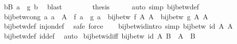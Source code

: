 \begin{isabellebody}
\ {\isachardoublequoteopen}{\isasymexists}b{\isasymin}B{\isachardot}{\kern0pt}\ a\ {\isacharequal}{\kern0pt}\ {\isacharquery}{\kern0pt}g\ b{\isachardoublequoteclose}\ \isamarkupfalse%
\ blast\isanewline
\ \ \isamarkupfalse%
\isanewline
\ \ \isamarkupfalse%
\ \isamarkupfalse%
\ {\isacharquery}{\kern0pt}thesis\isanewline
\ \ \ \ \isamarkupfalse%
\ {\isacharparenleft}{\kern0pt}auto\ simp{\isacharcolon}{\kern0pt}\ bij{\isacharunderscore}{\kern0pt}betw{\isacharunderscore}{\kern0pt}def{\isacharparenright}{\kern0pt}\isanewline
{}\isamarkupfalse%
%
\endisatagproof
{\isafoldproof}%
%
\isadelimproof
\isanewline
%
\endisadelimproof
\isanewline
{}\isamarkupfalse%
\ bij{\isacharunderscore}{\kern0pt}betw{\isacharunderscore}{\kern0pt}cong{\isacharcolon}{\kern0pt}\ {\isachardoublequoteopen}{\isacharparenleft}{\kern0pt}{\isasymAnd}a{\isachardot}{\kern0pt}\ a\ {\isasymin}\ A\ {\isasymLongrightarrow}\ f\ a\ {\isacharequal}{\kern0pt}\ g\ a{\isacharparenright}{\kern0pt}\ {\isasymLongrightarrow}\ bij{\isacharunderscore}{\kern0pt}betw\ f\ A\ A{\isacharprime}{\kern0pt}\ {\isacharequal}{\kern0pt}\ bij{\isacharunderscore}{\kern0pt}betw\ g\ A\ A{\isacharprime}{\kern0pt}{\isachardoublequoteclose}\isanewline
%
\isadelimproof
\ \ %
\endisadelimproof
%
\isatagproof
{}\isamarkupfalse%
\ bij{\isacharunderscore}{\kern0pt}betw{\isacharunderscore}{\kern0pt}def\ inj{\isacharunderscore}{\kern0pt}on{\isacharunderscore}{\kern0pt}def\ \isamarkupfalse%
\ safe\ force{\isacharplus}{\kern0pt}%
\endisatagproof
{\isafoldproof}%
%
\isadelimproof
%
\endisadelimproof
\ \ \isanewline
\isanewline
{}\isamarkupfalse%
\ bij{\isacharunderscore}{\kern0pt}betw{\isacharunderscore}{\kern0pt}id{\isacharbrackleft}{\kern0pt}intro{\isacharcomma}{\kern0pt}\ simp{\isacharbrackright}{\kern0pt}{\isacharcolon}{\kern0pt}\ {\isachardoublequoteopen}bij{\isacharunderscore}{\kern0pt}betw\ id\ A\ A{\isachardoublequoteclose}\isanewline
%
\isadelimproof
\ \ %
\endisadelimproof
%
\isatagproof
{}\isamarkupfalse%
\ bij{\isacharunderscore}{\kern0pt}betw{\isacharunderscore}{\kern0pt}def\ id{\isacharunderscore}{\kern0pt}def\ \isamarkupfalse%
\ auto%
\endisatagproof
{\isafoldproof}%
%
\isadelimproof
\isanewline
%
\endisadelimproof
\isanewline
{}\isamarkupfalse%
\ bij{\isacharunderscore}{\kern0pt}betw{\isacharunderscore}{\kern0pt}id{\isacharunderscore}{\kern0pt}iff{\isacharcolon}{\kern0pt}\ {\isachardoublequoteopen}bij{\isacharunderscore}{\kern0pt}betw\ id\ A\ B\ {\isasymlongleftrightarrow}\ A\ {\isacharequal}{\kern0pt}\ B{\isachardoublequoteclose}\isanewline

\end{isabellebody}
